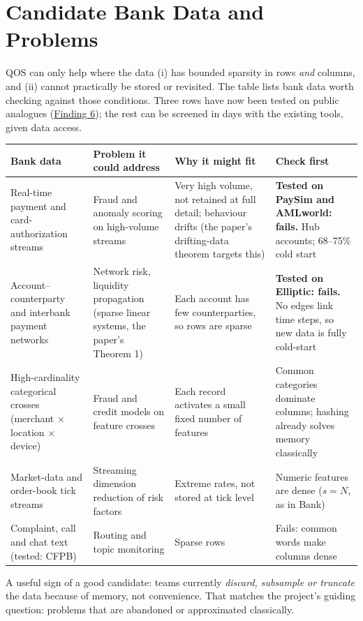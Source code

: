 \documentclass[10pt]{article}
\newenvironment{sectionblock}
{%
    \par
    \vspace{2pt}
    \noindent
    \begin{minipage}{\textwidth}
}
{%
    \end{minipage}
    \par
    \vspace{5pt}
}
\begin{document}
\begin{sectionblock}

\section{Candidate Bank Data and Problems}
\label{sec:data}

QOS can only help where the data (i) has bounded sparsity in rows \emph{and} columns, and (ii) cannot practically be stored or revisited. The table lists bank data worth checking against those conditions. Three rows have now been tested on public analogues (\hyperref[sec:f6]{Finding 6}); the rest can be screened in days with the existing tools, given data access.

\vspace{2pt}
\begin{center}
\small
\begin{tabularx}{\textwidth}{@{}>{\raggedright\arraybackslash}p{}YYY@{}}
\toprule
\textbf{Bank data} & \textbf{Problem it could address} & \textbf{Why it might fit} & \textbf{Check first} \\
\midrule
Real-time payment and card-authorization streams & Fraud and anomaly scoring on high-volume streams & Very high volume, not retained at full detail; behaviour drifts (the paper's drifting-data theorem targets this) & \textbf{Tested on PaySim and AMLworld: fails.} Hub accounts; 68--75\% cold start \\
Account--counterparty and interbank payment networks & Network risk, liquidity propagation (sparse linear systems, the paper's Theorem 1) & Each account has few counterparties, so rows are sparse & \textbf{Tested on Elliptic: fails.} No edges link time steps, so new data is fully cold-start \\
High-cardinality categorical crosses (merchant $\times$ location $\times$ device) & Fraud and credit models on feature crosses & Each record activates a small fixed number of features & Common categories dominate columns; hashing already solves memory classically \\
Market-data and order-book tick streams & Streaming dimension reduction of risk factors & Extreme rates, not stored at tick level & Numeric features are dense ($s=N$, as in Bank) \\
Complaint, call and chat text (tested: CFPB) & Routing and topic monitoring & Sparse rows & Fails: common words make columns dense \\
\bottomrule
\end{tabularx}
\end{center}

A useful sign of a good candidate: teams currently \emph{discard, subsample or truncate} the data because of memory, not convenience. That matches the project's guiding question: problems that are abandoned or approximated classically.

\end{sectionblock}
\end{document}
